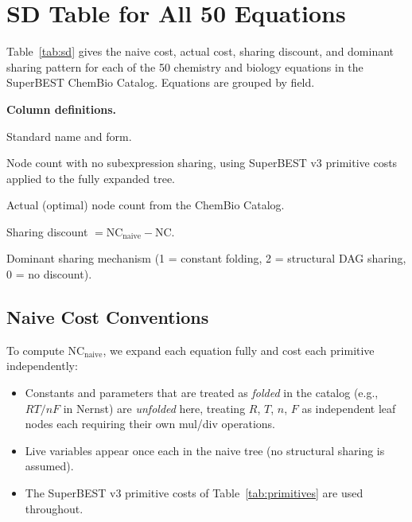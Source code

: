 \documentclass[12pt,a4paper]{article}
\theoremstyle{definition}
\newcommand{\NC}{\mathrm{NC}}
\newcommand{\SD}{\mathrm{SD}}
\begin{document}
\section{SD Table for All 50 Equations}
\label{sec:sdtable}

Table~\ref{tab:sd} gives the naive cost, actual cost, sharing discount, and
dominant sharing pattern for each of the 50 chemistry and biology equations
in the SuperBEST ChemBio Catalog.  Equations are grouped by field.

\medskip
\noindent\textbf{Column definitions.}
\begin{description}[noitemsep,font=\bfseries]
  \item[Equation:] Standard name and form.
  \item[$\NC_{\mathrm{naive}}$:] Node count with no subexpression sharing,
        using SuperBEST v3 primitive costs applied to the fully expanded tree.
  \item[$\NC$:] Actual (optimal) node count from the ChemBio Catalog.
  \item[$\SD$:] Sharing discount $= \NC_{\mathrm{naive}} - \NC$.
  \item[Pattern:] Dominant sharing mechanism (1 = constant folding,
        2 = structural DAG sharing, 0 = no discount).
\end{description}

\subsection{Naive Cost Conventions}

To compute $\NC_{\mathrm{naive}}$, we expand each equation fully and cost
each primitive independently:
\begin{itemize}[noitemsep]
  \item Constants and parameters that are treated as \emph{folded} in the
        catalog (e.g., $RT/nF$ in Nernst) are \emph{unfolded} here,
        treating $R$, $T$, $n$, $F$ as independent leaf nodes each requiring
        their own mul/div operations.
  \item Live variables appear once each in the naive tree (no structural
        sharing is assumed).
  \item The SuperBEST v3 primitive costs of Table~\ref{tab:primitives}
        are used throughout.
\end{itemize}
\end{document}
